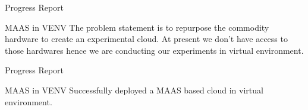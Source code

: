 \begin{frame}{Progress Report}
    \begin{block}{MAAS in VENV}
        The problem statement is to repurpose the commodity hardware to create an experimental cloud. 
        \linebreak
        \linebreak
        At present we don't have access to those hardwares hence we are conducting our experiments in virtual environment.
    \end{block}
\end{frame}

\begin{frame}{Progress Report}
    \begin{block}{MAAS in VENV}
        Successfully deployed a MAAS based cloud in virtual environment.
    \end{block}
\end{frame}
